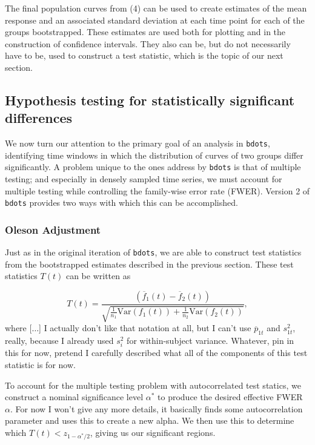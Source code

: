 \documentclass{article}
\newcommand{\xt}{\texttt}%
\begin{document}
The final population curves from (4) can be used to create estimates of the mean response and an associated standard deviation at each time point for each of the groups bootstrapped. These estimates are used both for plotting and in the construction of confidence intervals. They also can be, but do not necessarily have to be, used to construct a test statistic, which is the topic of our next section.

\subsection{Hypothesis testing for statistically significant differences}

We now turn our attention to the primary goal of an analysis in \xt{bdots}, identifying time windows in which the distribution of curves of two groups differ significantly. A problem unique to the ones address by \xt{bdots} is that of multiple testing; and especially in densely sampled time series, we must account for multiple testing while controlling the family-wise error rate (FWER). Version 2 of \xt{bdots} provides two ways with which this can be accomplished.

\subsubsection{Oleson Adjustment}

Just as in the original iteration of \xt{bdots}, we are able to construct test statistics from the bootstrapped estimates described in the previous section. These test statistics $T(t)$ can be written as 

\begin{equation}\label{eq:test_statistic}
T(t) = \frac{(\overline{f}_{1}(t) - \overline{f}_{2}(t))}{\sqrt{\frac{1}{n_1} \text{Var}(f_1(t)) + \frac{1}{n_2} \text{Var}(f_2(t))}},
\end{equation}
where [$\dots$] I actually don't like that notation at all, but I can't use $\overline{p}_{1t}$ and $s_{1t}^2$, really, because I already used $s_i^2$ for within-subject variance. Whatever, pin in this for now, pretend I carefully described what all of the components of this test statistic is for now.

To account for the multiple testing problem with autocorrelated test statics, we construct a nominal significance level $\alpha^*$ to produce the desired effective FWER $\alpha$. For now I won't give any more details, it basically finds some autocorrelation parameter and uses this to create a new alpha.  We then use this to determine which $T(t) < z_{1 -\alpha^*/2}$, giving us our significant regions. 
\end{document}
